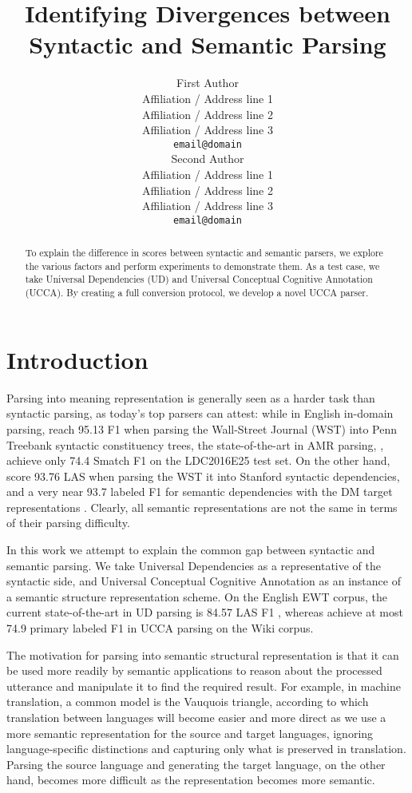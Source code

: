 \documentclass[11pt,a4paper]{article}
\title{Identifying Divergences between Syntactic and Semantic Parsing}
\author{First Author \\
  Affiliation / Address line 1 \\
  Affiliation / Address line 2 \\
  Affiliation / Address line 3 \\
  {\tt email@domain} \\\And
  Second Author \\
  Affiliation / Address line 1 \\
  Affiliation / Address line 2 \\
  Affiliation / Address line 3 \\
  {\tt email@domain} \\}
\date{}
\begin{document}
\maketitle

\begin{abstract}
To explain the difference in scores between syntactic and semantic parsers,
we explore the various factors and perform experiments to demonstrate them.
As a test case, we take Universal Dependencies (UD) and
Universal Conceptual Cognitive Annotation (UCCA).
By creating a full conversion protocol, we develop a novel UCCA parser.
\end{abstract}

\section{Introduction}\label{sec:introduction}

Parsing into meaning representation is generally seen as a harder task than
syntactic parsing, as today's top parsers can attest:
while in English in-domain parsing,
\citet{P18-1249} reach 95.13 F1 when parsing the Wall-Street Journal (WST) into
Penn Treebank syntactic constituency trees,
the state-of-the-art in AMR parsing, \citet{lyu2018amr},
achieve only 74.4 Smatch F1 on the LDC2016E25 test set.
On the other hand, \citet{dozat2016deep,P18-2077}
score 93.76 LAS when parsing the WST it into Stanford syntactic dependencies,
and a very near 93.7 labeled F1 for semantic dependencies with the
DM target representations \cite{oepen2016towards}.
Clearly, all semantic representations are not the same in terms of their parsing difficulty.

In this work we attempt to explain the common gap between syntactic and semantic parsing.
We take Universal Dependencies \cite[UD; ][]{nivre2016universal} as a representative of the syntactic side,
and Universal Conceptual Cognitive Annotation \cite[UCCA; ][]{abend2013universal}
as an instance of a semantic structure representation scheme.
On the English EWT corpus,
the current state-of-the-art in UD parsing is 84.57 LAS F1 \cite{che-EtAl:2018:K18-2},
whereas \citet{hershcovich2018multitask} achieve at most
74.9 primary labeled F1 in UCCA parsing on the Wiki corpus.

The motivation for parsing into semantic structural representation is that it can be used more readily
by semantic applications to reason about the processed utterance and manipulate it to find the required
result.
For example, in machine translation, a common model is the Vauquois triangle,
according to which translation between languages will become easier and more direct as we use
a more semantic representation for the source and target languages,
ignoring language-specific distinctions and capturing only what is preserved in translation.
Parsing the source language and generating the target language, on the other hand, becomes more
difficult as the representation becomes more semantic.
\end{document}

